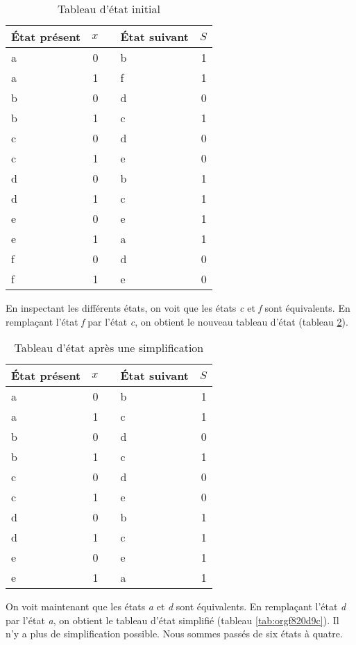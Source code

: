 \documentclass[11pt]{article}
\begin{document}
\begin{table}[htbp]
\caption{\label{tab:orgb6adf3b}Tableau d'état initial}
\centering
\begin{tabular}{lrllr}
État présent & \(x\) &  & État suivant & \(S\)\\[0pt]
\hline
a & 0 &  & b & 1\\[0pt]
a & 1 &  & f & 1\\[0pt]
b & 0 &  & d & 0\\[0pt]
b & 1 &  & c & 1\\[0pt]
c & 0 &  & d & 0\\[0pt]
c & 1 &  & e & 0\\[0pt]
d & 0 &  & b & 1\\[0pt]
d & 1 &  & c & 1\\[0pt]
e & 0 &  & e & 1\\[0pt]
e & 1 &  & a & 1\\[0pt]
f & 0 &  & d & 0\\[0pt]
f & 1 &  & e & 0\\[0pt]
\end{tabular}
\end{table}

En inspectant les différents états, on voit que les états \emph{c} et \emph{f}
sont équivalents. En remplaçant l'état \emph{f} par l'état \emph{c}, on obtient
le nouveau tableau d'état (tableau \ref{tab:orgcec1cf6}).

\begin{table}[htbp]
\caption{\label{tab:orgcec1cf6}Tableau d'état après une simplification}
\centering
\begin{tabular}{lrllr}
État présent & \(x\) &  & État suivant & \(S\)\\[0pt]
\hline
a & 0 &  & b & 1\\[0pt]
a & 1 &  & c & 1\\[0pt]
b & 0 &  & d & 0\\[0pt]
b & 1 &  & c & 1\\[0pt]
c & 0 &  & d & 0\\[0pt]
c & 1 &  & e & 0\\[0pt]
d & 0 &  & b & 1\\[0pt]
d & 1 &  & c & 1\\[0pt]
e & 0 &  & e & 1\\[0pt]
e & 1 &  & a & 1\\[0pt]
\end{tabular}
\end{table}

On voit maintenant que les états \emph{a} et \emph{d} sont équivalents. En
remplaçant l'état \emph{d} par l'état \emph{a}, on obtient le tableau d'état
simplifié (tableau \ref{tab:orgf820d9c}). Il n'y a plus de simplification
possible. Nous sommes passés de six états à quatre.
\end{document}
